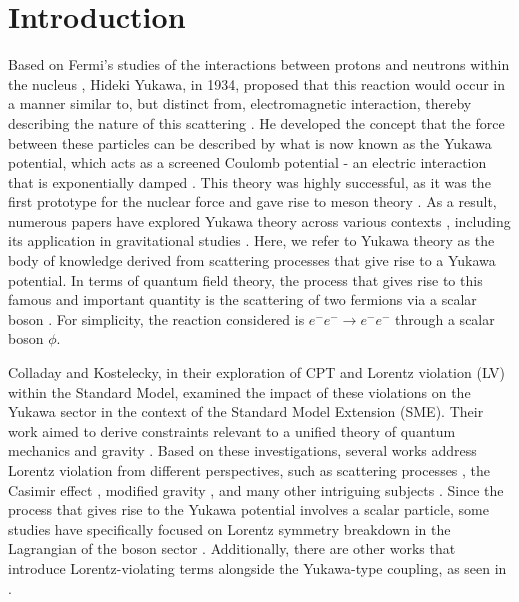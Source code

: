 \documentclass[11pt,showpacs,preprintnumbers,amsmath,amssymb,prd,nofootinbib,superscriptaddress]{revtex4-2}
\begin{document}
\maketitle

\section{Introduction}

Based on Fermi's studies of the interactions between protons and neutrons within the nucleus \cite{fermi}, Hideki Yukawa, in 1934, proposed that this reaction would occur in a manner similar to, but distinct from, electromagnetic interaction, thereby describing the nature of this scattering \cite{yukawa}. He developed the concept that the force between these particles can be described by what is now known as the Yukawa potential, which acts as a screened Coulomb potential - an electric interaction that is exponentially damped \cite{screened1, screened2}. This theory was highly successful, as it was the first prototype for the nuclear force and gave rise to meson theory \cite{nambuyukawa}. As a result, numerous papers have explored Yukawa theory across various contexts \cite{refyuk1, refyuk2, refyuk3, refyuk4}, including its application in gravitational studies \cite{yukawagravity}. Here, we refer to Yukawa theory as the body of knowledge derived from scattering processes that give rise to a Yukawa potential. In terms of quantum field theory, the process that gives rise to this famous and important quantity is the scattering of two fermions via a scalar boson \cite{peskin, ryder}. For simplicity, the reaction considered is $e^{-}e^{-} \to e^{-}e^{-}$ through a scalar boson $\phi$.

Colladay and Kostelecky, in their exploration of CPT and Lorentz violation (LV) within the Standard Model, examined the impact of these violations on the Yukawa sector in the context of the Standard Model Extension (SME). Their work aimed to derive constraints relevant to a unified theory of quantum mechanics and gravity \cite{kostelecky1, kostelecky2, kosteleckycs, kostelecky2004gravity}. Based on these investigations, several works address Lorentz violation from different perspectives, such as scattering processes \cite{scatter1, scatter3, cabral2023violation, santos2020gravitational}, the Casimir effect \cite{santos2019lorentz, ferreira2022tfd, santos2022corrections}, modified gravity \cite{jesus2020godel, santos2015godel, jesus2019ricci}, and many other intriguing subjects \cite{aguirrelorentz, araujo2021thermodynamic, aa2021lorentz, filho2021thermal, araujo2021higher}. Since the process that gives rise to the Yukawa potential involves a scalar particle, some studies have specifically focused on Lorentz symmetry breakdown in the Lagrangian of the boson sector \cite{altschul}. Additionally, there are other works that introduce Lorentz-violating terms alongside the Yukawa-type coupling, as seen in \cite{mmferreira}.
\end{document}
